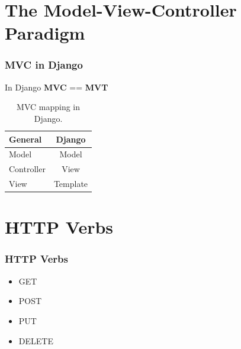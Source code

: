 \documentclass[10pt,t,xcolor=dvipsnames]{beamer}
\begin{document}
\section{The Model-View-Controller Paradigm}
\begin{frame}
\frametitle{MVC in Django}
\pause
\centering
In Django \textbf{MVC} == \textbf{\alert{MVT}}
\begin{table}
\bigger
\centering
\begin{tabular}{|l|c|}\hline
\textbf{General}  &\textbf{Django}\\ \hline\hline
Model&Model\\ \hline
Controller&View\\ \hline
View&Template\\ \hline
\end{tabular}
\caption{\footnotesize MVC mapping in Django.}
\end{table}
\end{frame}


\section{HTTP Verbs}
\begin{frame}
\frametitle{HTTP Verbs}
\pause
\begin{itemize}[<+->]
\item GET
\item POST
\item PUT
\item DELETE
\end{itemize}
\end{frame}
\end{document}
